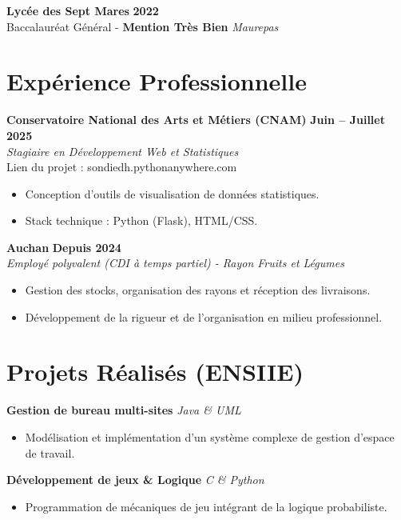 \documentclass[10pt, a4paper]{article}
\begin{document}
\vspace{4pt}
\textbf{Lycée des Sept Mares} \hfill \textbf{2022} \\
Baccalauréat Général - \textbf{Mention Très Bien} \hfill \textit{Maurepas}

\section{Expérience Professionnelle}

\textbf{Conservatoire National des Arts et Métiers (CNAM)} \hfill \textbf{Juin -- Juillet 2025} \\
\textit{Stagiaire en Développement Web et Statistiques} \\
Lien du projet : sondiedh.pythonanywhere.com
\begin{itemize}
    \item Conception d'outils de visualisation de données statistiques.
    \item Stack technique : Python (Flask), HTML/CSS.
\end{itemize}

\vspace{6pt}

\textbf{Auchan} \hfill \textbf{Depuis 2024} \\
\textit{Employé polyvalent (CDI à temps partiel) - Rayon Fruits et Légumes}
\begin{itemize}
    \item Gestion des stocks, organisation des rayons et réception des livraisons.
    \item Développement de la rigueur et de l'organisation en milieu professionnel.
\end{itemize}

\section{Projets Réalisés (ENSIIE)}

\textbf{Gestion de bureau multi-sites} \hfill \textit{Java \& UML}
\begin{itemize}
    \item Modélisation et implémentation d'un système complexe de gestion d'espace de travail.
\end{itemize}

\vspace{6pt}

\textbf{Développement de jeux \& Logique} \hfill \textit{C \& Python}
\begin{itemize}
    \item Programmation de mécaniques de jeu intégrant de la logique probabiliste.
\end{itemize}
\end{document}
